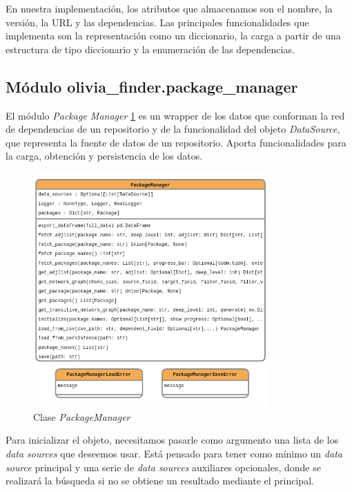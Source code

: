 En nuestra implementación, los atributos que almacenamos son el nombre, la versión, la URL y las
dependencias. Las principales funcionalidades que implementa son la representación como un
diccionario, la carga a partir de una estructura de tipo diccionario y la enumeración de las
dependencias.

\subsection{Módulo olivia\_finder.package\_manager}

El módulo \textit{Package Manager} \ref{fig:package_manager} es un wrapper de los datos que conforman la red de dependencias de
un repositorio y de la funcionalidad del objeto \textit{DataSource}, que representa la fuente de
datos de un repositorio. Aporta funcionalidades para la carga, obtención y persistencia de los datos.

\begin{figure}[ht!]
    \centering
    \includegraphics[width=0.8\textwidth]{img/anexos/package_manager.png}
    \caption{Clase \textit{PackageManager}}
    \label{fig:package_manager}
\end{figure}

Para inicializar el objeto, necesitamos pasarle como argumento una lista de los \textit{data sources}
que deseemos usar. Está pensado para tener como mínimo un \textit{data source} principal y una serie
de \textit{data sources} auxiliares opcionales, donde se realizará la búsqueda si no se obtiene un
resultado mediante el principal.

